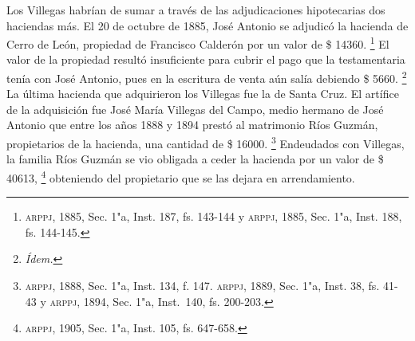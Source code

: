 \documentclass[14pt,twoside,final]{extbook} %
\let\oldfootnote\footnote
\renewcommand\footnote[1]{%
\oldfootnote{\hspace{1mm}#1}}
\begin{document}
Los Villegas habrían de sumar a través de las adjudicaciones hipotecarias dos haciendas más. El 20 de octubre de 1885, José Antonio se adjudicó la hacienda de Cerro de León, propiedad de Francisco Calderón por un valor de \$ 14360.\footnote{\textsc{arppj}, 1885, Sec. 1"a, Inst. 187, fs. 143-144 y \textsc{arppj}, 1885, Sec. 1"a, Inst. 188, fs. 144-145.} El valor de la propiedad resultó insuficiente para cubrir el pago que la testamentaria tenía con José Antonio, pues en la escritura de venta aún salía debiendo \$ 5660.\footnote{\em Ídem.} La última hacienda que adquirieron los Villegas fue la de Santa Cruz. El artífice de la adquisición fue José María Villegas del Campo, medio hermano de José Antonio que entre los años 1888 y 1894 prestó al matrimonio Ríos Guzmán, propietarios de la hacienda, una cantidad de \$ 16000.\footnote{\textsc{arppj}, 1888, Sec. 1"a, Inst. 134, f. 147. \textsc{arppj}, 1889, Sec. 1"a, Inst. 38, fs. 41-43 y \textsc{arppj}, 1894, Sec. 1"a, Inst.~140, fs. 200-203.} Endeudados con Villegas, la familia Ríos Guzmán se vio obligada a ceder la hacienda por un valor de \$ 40613,\footnote{\textsc{arppj}, 1905, Sec. 1"a, Inst. 105, fs. 647-658.} obteniendo del propietario que se las dejara en arrendamiento.
\end{document}
